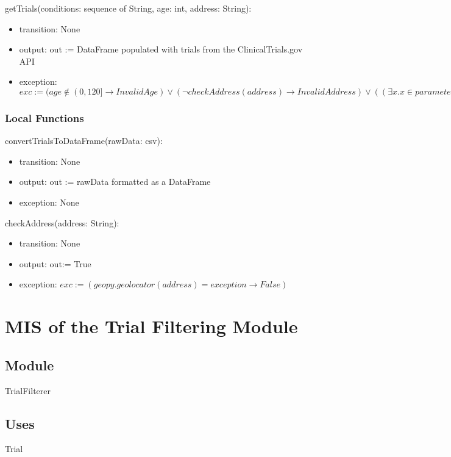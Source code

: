 \documentclass[12pt, titlepage]{article}
\begin{document}
\noindent getTrials(conditions: sequence of String, age: int, address: String):
\begin{itemize}
\item transition: None
\item output: out := DataFrame populated with trials from the ClinicalTrials.gov API
\item exception: $exc := (age \notin (0,120] \rightarrow InvalidAge) \lor (\neg checkAddress(address) \rightarrow InvalidAddress) \lor ((\exists x . x \in parameters : x = \varepsilon) \rightarrow MissingParameter)$
\end{itemize}

\subsubsection{Local Functions}
\noindent convertTrialsToDataFrame(rawData: csv):
\begin{itemize}
\item transition: None
\item output: out := rawData formatted as a DataFrame
\item exception: None
\end{itemize}

\noindent checkAddress(address: String):
\begin{itemize}
\item transition: None
\item output: out:= True
\item exception: $exc := (geopy.geolocator(address) = exception \rightarrow False)$
\end{itemize}


\section{MIS of the Trial Filtering Module} \label{User}

\subsection{Module}

TrialFilterer

\subsection{Uses}

Trial
\end{document}
